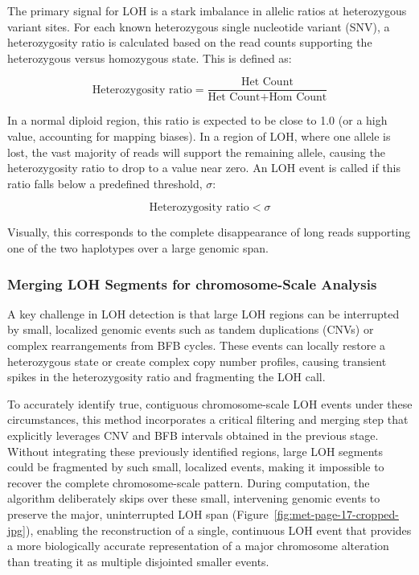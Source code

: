 \documentclass[pdflatex,sn-nature]{sn-jnl}
\begin{document}
The primary signal for LOH is a stark imbalance in allelic ratios at heterozygous variant sites. For each known heterozygous single nucleotide variant (SNV), a heterozygosity ratio is calculated based on the read counts supporting the heterozygous versus homozygous state. This is defined as:

\[
\text{Heterozygosity ratio} = \frac{\text{Het Count}}{\text{Het Count} + \text{Hom Count}}
\]

In a normal diploid region, this ratio is expected to be close to 1.0 (or a high value, accounting for mapping biases). In a region of LOH, where one allele is lost, the vast majority of reads will support the remaining allele, causing the heterozygosity ratio to drop to a value near zero. An LOH event is called if this ratio falls below a predefined threshold, $\sigma$:

\[
\text{Heterozygosity ratio} < \sigma
\]

Visually, this corresponds to the complete disappearance of long reads supporting one of the two haplotypes over a large genomic span.

\subsubsection{Merging LOH Segments for chromosome-Scale Analysis}\label{merging-loh-segments-for-chromosome-scale-analysis}

A key challenge in LOH detection is that large LOH regions can be interrupted by small, localized genomic events such as tandem duplications (CNVs) or complex rearrangements from BFB cycles. These events can locally restore a heterozygous state or create complex copy number profiles, causing transient spikes in the heterozygosity ratio and fragmenting the LOH call.

To accurately identify true, contiguous chromosome-scale LOH events under these circumstances, this method incorporates a critical filtering and merging step that explicitly leverages CNV and BFB intervals obtained in the previous stage. Without integrating these previously identified regions, large LOH segments could be fragmented by such small, localized events, making it impossible to recover the complete chromosome-scale pattern. During computation, the algorithm deliberately skips over these small, intervening genomic events to preserve the major, uninterrupted LOH span (Figure~\ref{fig:met-page-17-cropped-jpg}), enabling the reconstruction of a single, continuous LOH event that provides a more biologically accurate representation of a major chromosome alteration than treating it as multiple disjointed smaller events.
\end{document}

